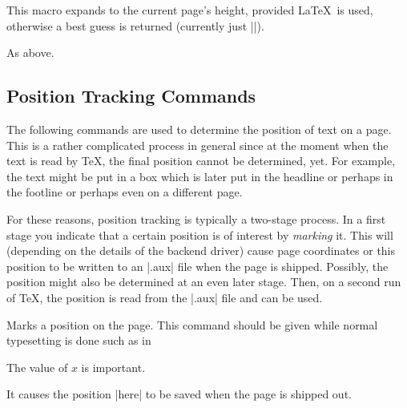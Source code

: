 
\begin{command}{\pgfsys@thepageheight}
  This macro expands to the current page's height, provided \LaTeX\ is
  used, otherwise a best guess is returned (currently just |\the\vsize|). 
\end{command}

\begin{command}{\pgfsys@thepagewidth}
  As above.
\end{command}

\subsection{Position Tracking Commands}

The following commands are used to determine the position of text on a
page. This is a rather complicated process in general since at the
moment when the text is read by \TeX, the final position cannot be
determined, yet. For example, the text might be put in a box which is
later put in the headline or perhaps in the footline or perhaps even
on a different page.

For these reasons, position tracking is typically a two-stage
process. In a first stage you indicate that a certain position is of
interest by \emph{marking} it. This will (depending on the details of
the backend driver) cause page coordinates or this position to be
written to an |.aux| file when the page is shipped. Possibly, the
position might also be determined at an even later stage. Then, on a
second run of \TeX, the position is read from the |.aux| file and can
be used.

\begin{command}{\pgfsys@markposition{}}
  Marks a position on the page. This command should be given while
  normal typesetting is done such as in
\begin{codeexample}
The value of $x$ is important.
\end{codeexample}
  It causes the position |here| to be saved when the page is shipped
  out.
\end{command}

